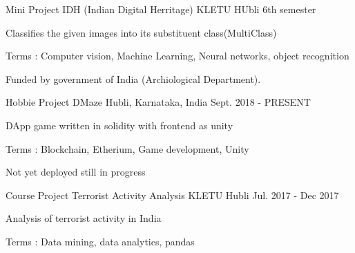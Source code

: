 


\begin{cventries}


\cventry
{Mini Project} %
{IDH (Indian Digital Herritage)} %
{KLETU HUbli} %
{6th semester} %
{ %
\begin{cvitems}
\item {Classifies the given images into its substituent class(MultiClass)}
\item {Terms : Computer vision, Machine Learning, Neural networks, object recognition}
\item {Funded by government of India  (Archiological Department).}
\end{cvitems}
}


\cventry
{Hobbie Project} %
{DMaze} %
{Hubli, Karnataka, India} %
{Sept. 2018 - PRESENT} %
{ %
\begin{cvitems}
\item {DApp game written in solidity with frontend as unity}
\item {Terms : Blockchain, Etherium, Game development, Unity}
\item {Not yet deployed still in progress}
\end{cvitems}
}


\cventry
{Course Project} %
{Terrorist Activity Analysis} %
{KLETU Hubli} %
{Jul. 2017 - Dec 2017} %
{ %
\begin{cvitems}
\item {Analysis of terrorist activity in India}
\item {Terms : Data mining, data analytics, pandas}
\end{cvitems}
}


\end{cventries}
